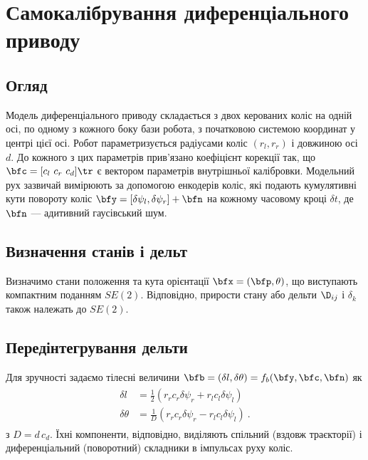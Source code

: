 
\section{Самокалібрування диференціального приводу}
\label{sec:diff_drive}

\subsection{Огляд}

Модель диференціального приводу складається з двох керованих коліс на одній осі, по одному з кожного боку бази робота,
з початковою системою координат у центрі цієї осі.
Робот параметризується
радіусами коліс $(r_l, r_r)$ і довжиною осі $d$.
До кожного з цих параметрів прив'язано коефіцієнт корекції так, що
$\bfc=[c_l~c_r~c_d]\tr$ є вектором параметрів внутрішньої калібровки.
%
Модельний рух зазвичай вимірюють за допомогою енкодерів коліс, які подають кумулятивні кути повороту коліс $
\bfy=[\delta\psi_l, \delta\psi_r]+\bfn$
на кожному часовому кроці $
\delta t$, де $
\bfn$ — адитивний гаусівський шум.


\subsection{Визначення станів і дельт}
%
Визначимо стани положення та кута орієнтації
$\bfx=(\bfp,\theta)$, що виступають компактним поданням $SE(2)$.
Відповідно, прирости стану або дельти $\D_{ij}$ і $\delta_k$ також належать до $SE(2)$.


%
\subsection{Передінтегрування дельти}

Для зручності задаємо тілесні величини
$\bfb=(\delta l,\delta \theta)=f_b(\bfy,\bfc,\bfn)$ як
%
%
\begin{align}
\label{equ:diff_drive_psis}
\begin{split}
\delta l &= \tfrac12(r_r c_r \delta\psi_r + r_l c_l\delta\psi_l)  \\
\delta \theta &= \tfrac{1}{D}(r_r c_r \delta\psi_r - r_l c_l\delta\psi_l) 
~.
\end{split}
\end{align}
%
з $D=d\,c_d$.
Їхні компоненти, відповідно, виділяють спільний (вздовж траєкторії) і диференціальний (поворотний) складники в імпульсах руху коліс.

